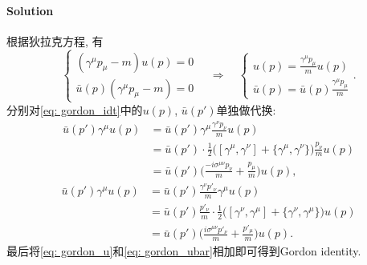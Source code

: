 \paragraph*{Solution} 根据狄拉克方程, 有
\begin{equation*}
  \left\{
  \begin{array}{c}
    (\gamma^\mu p_\mu - m)u(p) = 0 \\
    \bar{u}(p)(\gamma^\mu p_\mu - m) = 0
  \end{array}
  \right.
  \quad\Rightarrow\quad
  \left\{
  \begin{array}{c}
    u(p) = \frac{\gamma^\mu p_\mu}{m}u(p) \\
    \bar{u}(p) = \bar{u}(p)\frac{\gamma^\mu p_\mu}{m}
  \end{array}
  \right..
\end{equation*}
分别对\eqref{eq: gordon_idt}中的$u(p)$, $\bar{u}(p')$单独做代换:
\begin{equation}\label{eq: gordon_u}
  \begin{aligned}
    \bar{u}(p')\gamma^\mu u(p) & = \bar{u}(p')\gamma^\mu \frac{\gamma^\nu p_\nu}{m}u(p)                                                               \\
                               & = \bar{u}(p')\cdot\frac{1}{2}\biggl([\gamma^\mu, \gamma^\nu] + \{\gamma^\mu, \gamma^\nu\}\biggr) \frac{p_\nu}{m}u(p) \\
                               & = \bar{u}(p')\biggl(\frac{-i\sigma^{\mu\nu}p_\nu}{m} + \frac{p_\mu}{m}\biggr)u(p),
  \end{aligned}
\end{equation}
\begin{equation}\label{eq: gordon_ubar}
  \begin{aligned}
    \bar{u}(p')\gamma^\mu u(p) & = \bar{u}(p')\frac{\gamma^\nu p'_\nu}{m}\gamma^\mu u(p)                                                                \\
                               & = \bar{u}(p') \frac{p'_\nu}{m}\cdot\frac{1}{2}\biggl([\gamma^\nu, \gamma^\mu] + \{\gamma^\nu, \gamma^\mu\}\biggr) u(p) \\
                               & = \bar{u}(p')\biggl(\frac{i\sigma^{\mu\nu}p'_\nu}{m} + \frac{p'_\mu}{m}\biggr)u(p).
  \end{aligned}
\end{equation}
最后将\eqref{eq: gordon_u}和\eqref{eq: gordon_ubar}相加即可得到Gordon identity.


